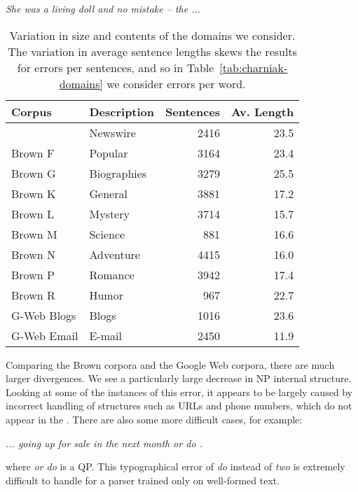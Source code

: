 \vspace{3mm}
\emph{She was a living doll and no mistake -- the ... }
\vspace{3mm}

\begin{table}
\begin{center}
\begin{tabular}{|llrr|}
	\hline
		Corpus & Description & Sentences & Av. Length \\
	\hline
	\hline
		\wsj 23 & Newswire & 2416 & 23.5 \\
		Brown F & Popular & 3164 & 23.4 \\
		Brown G & Biographies & 3279 & 25.5 \\
		Brown K & General & 3881 & 17.2 \\
		Brown L & Mystery & 3714 & 15.7 \\
		Brown M & Science & 881 & 16.6 \\
		Brown N & Adventure & 4415 & 16.0 \\
		Brown P & Romance & 3942 & 17.4 \\
		Brown R & Humor & 967 & 22.7 \\
		G-Web Blogs & Blogs & 1016 & 23.6 \\
		G-Web Email & E-mail & 2450 & 11.9 \\
	\hline
\end{tabular}
\caption[Variation in size and contents of the domains we consider.]{ \label{tab:domain-info}
	Variation in size and contents of the domains we consider.	The variation in
	average sentence lengths skews the results for errors per sentences, and so
	in Table~\ref{tab:charniak-domains} we consider errors per word.
}
\end{center}
\end{table}

Comparing the Brown corpora and the Google Web corpora, there are much larger
divergences.  We see a particularly large decrease in NP internal structure.
Looking at some of the instances of this error, it appears to be largely caused
by incorrect handling of structures such as URLs and phone numbers, which do
not appear in the \ptb.  There are also some more difficult cases, for example:

\vspace{3mm}
\emph{... going up for sale in the next month or do .}
\vspace{3mm}

\noindent where \emph{or do} is a QP.
This typographical error of \emph{do} instead of \emph{two} is extremely difficult to handle for a parser trained only on well-formed text.


